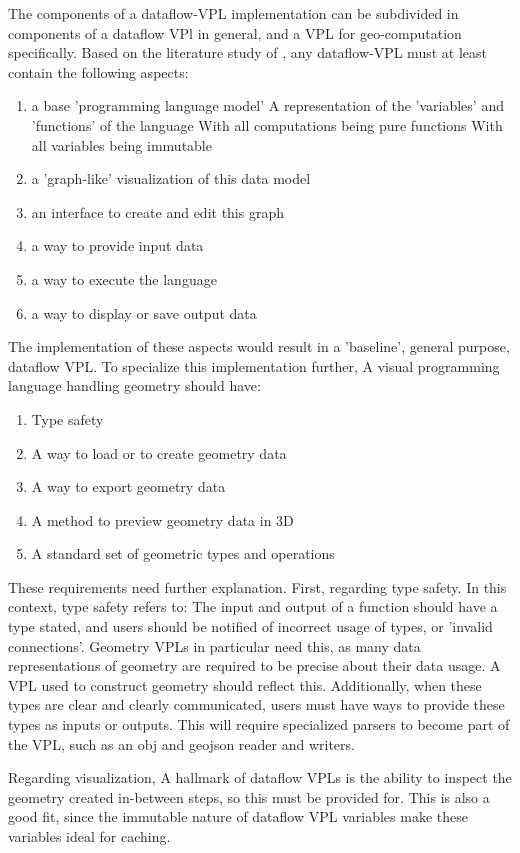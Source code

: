 The components of a dataflow-VPL implementation can be subdivided in components of a dataflow VPl in general, and a VPL for geo-computation specifically.
Based on the literature study of , any dataflow-VPL must at least contain the following aspects: 
\begin{enumerate}[-]
  \item a base 'programming language model'
  \subitem A representation of the 'variables' and 'functions' of the language
  \subitem With all computations being pure functions
  \subitem With all variables being immutable
  \item a 'graph-like' visualization of this data model
  \item an interface to create and edit this graph 
  \item a way to provide input data 
  \item a way to execute the language
  \item a way to display or save output data
\end{enumerate}
The implementation of these aspects would result in a 'baseline', general purpose, dataflow VPL. 
To specialize this implementation further, A visual programming language handling geometry should have:
\begin{enumerate}[-]
  \item Type safety 
  \item A way to load or to create geometry data 
  \item A way to export geometry data
  \item A method to preview geometry data in 3D
  \item A standard set of geometric types and operations
\end{enumerate}
These requirements need further explanation.
First, regarding type safety.
In this context, type safety refers to: 
The input and output of a function should have a type stated, and users should be notified of incorrect usage of types, or 'invalid connections'.
Geometry VPLs in particular need this, as many data representations of geometry are required to be precise about their data usage.
A VPL used to construct geometry should reflect this.
Additionally, when these types are clear and clearly communicated, users must have ways to provide these types as inputs or outputs. 
This will require specialized parsers to become part of the VPL, such as an obj and geojson reader and writers. 

Regarding visualization, A hallmark of dataflow VPLs is the ability to inspect the geometry created in-between steps, so this must be provided for.
This is also a good fit, since the immutable nature of dataflow VPL variables make these variables ideal for caching. 

